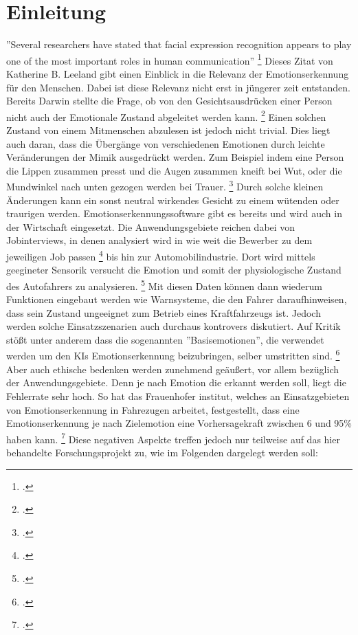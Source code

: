 \documentclass[12pt, a4paper]{scrbook}
\begin{document}
\chapter{Einleitung}
''Several researchers have stated that facial expression recognition appears to play one of the most important roles in human communication'' 
\footcite[Vgl.][1]{FaceRec}
Dieses Zitat von Katherine B. Leeland gibt einen Einblick in die Relevanz der Emotionserkennung für den Menschen. Dabei ist diese Relevanz nicht erst in jüngerer zeit entstanden. Bereits Darwin
stellte die Frage, ob von den Gesichtsausdrücken einer Person nicht auch der Emotionale Zustand abgeleitet werden kann.
\footcite[Vgl.][2]{FaceRec}
Einen solchen Zustand von einem Mitmenschen abzulesen ist jedoch nicht trivial. Dies liegt auch daran, dass die Übergänge von verschiedenen Emotionen durch leichte Veränderungen der Mimik
ausgedrückt werden. Zum Beispiel indem eine Person die Lippen zusammen presst und die Augen zusammen kneift bei Wut, oder die Mundwinkel nach unten gezogen werden bei Trauer.
\footcite[Vgl.][249]{HandbookFaceRec}
Durch solche kleinen Änderungen kann ein sonst neutral wirkendes Gesicht zu einem wütenden oder traurigen werden.
Emotionserkennungssoftware gibt es bereits und wird auch in der Wirtschaft eingesetzt. Die Anwendungsgebiete reichen dabei von Jobinterviews, in denen analysiert wird in wie weit die Bewerber zu
dem jeweiligen Job passen
\footcite[Vgl.][]{mixedArticle}
bis hin zur Automobilindustrie. Dort wird mittels geegineter Sensorik versucht die Emotion und somit der physiologische Zustand des Autofahrers zu analysieren.
\footcite[Vgl.][Herausforderung]{Frauenhofer}
Mit diesen Daten können dann wiederum Funktionen eingebaut werden wie Warnsysteme, die den Fahrer daraufhinweisen, dass sein Zustand ungeeignet zum Betrieb eines Kraftfahrzeugs ist. Jedoch werden
solche Einsatzszenarien auch durchaus kontrovers diskutiert. Auf Kritik stößt unter anderem dass die sogenannten ''Basisemotionen'', die verwendet werden um den KIs Emotionserkennung
beizubringen, selber umstritten sind.
\footcite[Vgl.][]{SZ}
Aber auch ethische bedenken werden zunehmend geäußert, vor allem bezüglich der Anwendungsgebiete. Denn je nach Emotion die erkannt werden soll, liegt die Fehlerrate sehr hoch. So hat das
Frauenhofer institut, welches an Einsatzgebieten von Emotionserkennung in Fahrezugen arbeitet, festgestellt, dass eine Emotionserkennung je nach Zielemotion eine Vorhersagekraft zwischen 6 und
95\% haben kann.
\footcite[Vgl.][Ergebnis]{Frauenhofer}
Diese negativen Aspekte treffen jedoch nur teilweise auf das hier behandelte Forschungsprojekt zu, wie im Folgenden dargelegt werden soll:
\end{document}
